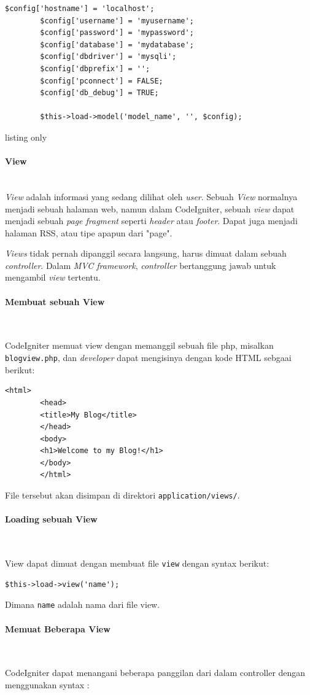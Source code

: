 \documentclass[a4paper,twoside]{article}
\newcommand{\myparagraph}[1]{\paragraph{#1}\mbox{}\\}
\begin{document}
\begin{enumerate}
		\begin{lstlisting}[frame=single]
		$config['hostname'] = 'localhost';
		$config['username'] = 'myusername';
		$config['password'] = 'mypassword';
		$config['database'] = 'mydatabase';
		$config['dbdriver'] = 'mysqli';
		$config['dbprefix'] = '';
		$config['pconnect'] = FALSE;
		$config['db_debug'] = TRUE;
		
		$this->load->model('model_name', '', $config);
		\end{lstlisting}{listing only}
		
		\myparagraph{View}
		\label{subs:view}
		\textit{View} adalah informasi yang sedang dilihat oleh \textit{user}. Sebuah \textit{View} normalnya menjadi sebuah halaman web, namun dalam CodeIgniter, sebuah \textit{view} dapat menjadi sebuah \textit{page fragment} seperti \textit{header} atau \textit{footer}. Dapat juga menjadi halaman RSS, atau tipe apapun dari "page".
		
		\textit{Views} tidak pernah dipanggil secara langsung, harus dimuat dalam sebuah \textit{controller}. Dalam \textit{MVC framework}, \textit{controller} bertanggung jawab untuk mengambil \textit{view} tertentu. 
		
		\myparagraph{Membuat sebuah View} \par
		CodeIgniter memuat view dengan memanggil sebuah file php, misalkan \verb|blogview.php|, dan \textit{developer} dapat mengisinya dengan kode HTML sebgaai berikut:
		\begin{lstlisting}[frame=single] 
		<html>
		<head>
		<title>My Blog</title>
		</head>
		<body>
		<h1>Welcome to my Blog!</h1>
		</body>
		</html>
		\end{lstlisting}
		
		File tersebut akan disimpan di direktori \texttt{application/views/}.
		
		\myparagraph{Loading sebuah View} \par
		
		
		View dapat dimuat dengan membuat file \texttt{view} dengan syntax berikut:
		
		\begin{lstlisting}[frame=single] 
		$this->load->view('name');
		\end{lstlisting}
		
		\noindent Dimana \texttt{name} adalah nama dari file view.
		
		\myparagraph{Memuat Beberapa View} \par
		
		CodeIgniter dapat menangani beberapa panggilan dari dalam controller dengan menggunakan syntax : 
		

\end{enumerate}
\end{document}
